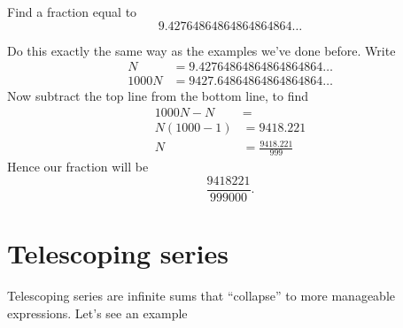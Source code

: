 \documentclass{ximera}
\begin{document}
\begin{example}
  Find a fraction equal to
  \[
  9.42764864864864864864\dots
  \]
  \begin{explanation}
    Do this exactly the same way as the examples we've done
    before. Write
    \begin{align*}
    N &=         9.42764864864864864864\dots\\
    1000 N &= 9427.64864864864864864\dots
    \end{align*}
    Now subtract the top line from the bottom line, to find
    \begin{align*}
      1000N - N &= \\
      N(1000-1) &= 9418.221\\
      N &= \frac{9418.221}{999}
    \end{align*}
    Hence our fraction will be
    \[
    \frac{9418221}{999000}.
    \]
  \end{explanation}
\end{example}



\section{Telescoping series}

Telescoping series are infinite sums that ``collapse'' to more
manageable expressions.  Let's see an example
\end{document}
